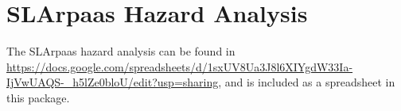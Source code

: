 \section{SLArpaas Hazard Analysis}
\label{app:hazard_ana}

The SLArpaas hazard analysis can be found in 
\url{https://docs.google.com/spreadsheets/d/1sxUV8Ua3J8l6XIYgdW33Ia-IjVwUAQS-_h5lZe0bloU/edit?usp=sharing},
and is included as a spreadsheet in this package.